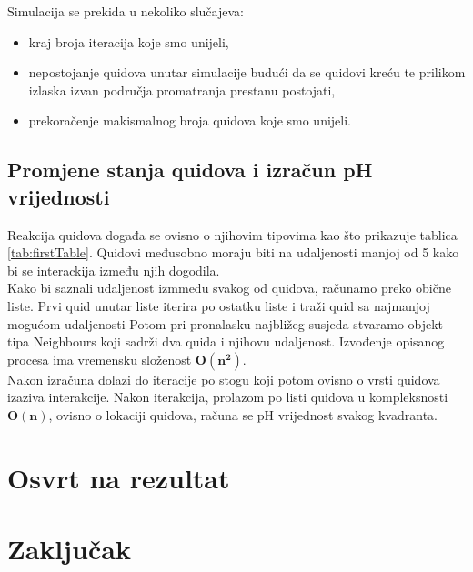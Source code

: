 \documentclass[12pt]{article}
\begin{document}
	Simulacija se prekida u nekoliko slučajeva:
	\begin{itemize}
		\item kraj broja iteracija koje smo unijeli,
		\item nepostojanje quidova unutar simulacije budući da se quidovi kreću te prilikom izlaska izvan područja promatranja prestanu postojati,
		\item prekoračenje makismalnog broja quidova koje smo unijeli.
	\end{itemize}
	
	\subsection{Promjene stanja quidova i izračun pH vrijednosti}
	Reakcija quidova događa se ovisno o njihovim tipovima kao što prikazuje tablica \ref{tab:firstTable}. Quidovi međusobno moraju biti na udaljenosti manjoj od 5 kako bi se interackija između njih dogodila.\\
	Kako bi saznali udaljenost izmmeđu svakog od quidova, računamo preko obične liste. Prvi quid unutar liste iterira po ostatku liste i traži quid sa najmanjoj mogućom udaljenosti
	Potom pri pronalasku najbližeg susjeda stvaramo objekt tipa Neighbours koji sadrži dva quida i njihovu udaljenost. Izvođenje opisanog procesa ima vremensku složenost $\mathbf{O(n^2)}$.\\
	Nakon izračuna dolazi do iteracije po stogu koji potom ovisno o vrsti quidova izaziva interakcije. Nakon iterakcija,
	prolazom po listi quidova u kompleksnosti $\mathbf{O(n)}$, ovisno o lokaciji quidova, računa se pH vrijednost svakog kvadranta.
	
	\section{Osvrt na rezultat}
	
	\section{Zaključak}
	
\end{document}
